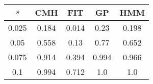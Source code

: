 \centering \begin{tabular}{c|c|c|c|c}
$s$	&CMH	&FIT	&GP	&HMM\\\hline
0.025	&0.184	&0.014	&0.23	&0.198\\
0.05	&0.558	&0.13	&0.77	&0.652\\
0.075	&0.914	&0.394	&0.994	&0.966\\
0.1	&0.994	&0.712	&1.0	&1.0\\
\end{tabular}
